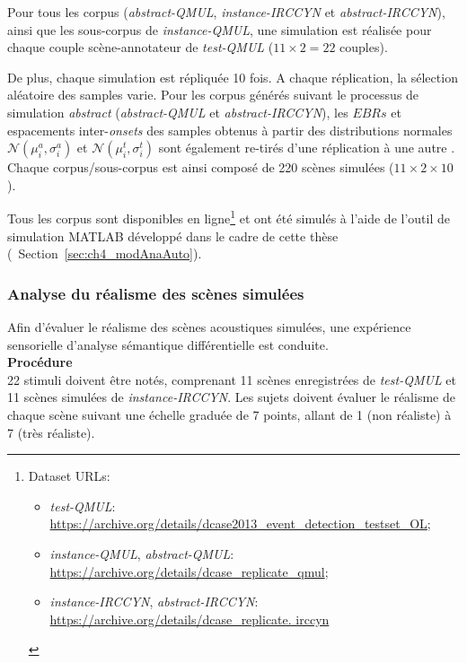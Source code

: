Pour tous les corpus (\emph{abstract-QMUL}, \emph{instance-IRCCYN} et \emph{abstract-IRCCYN}), ainsi que les sous-corpus de \emph{instance-QMUL}, une simulation est réalisée pour chaque couple scène-annotateur de \emph{test-QMUL} ($11\times2=22$ couples). 

De plus, chaque simulation est répliquée 10 fois. A chaque réplication, la sélection aléatoire des samples varie. Pour les corpus générés suivant le processus de simulation \emph{abstract} (\emph{abstract-QMUL} et \emph{abstract-IRCCYN}), les $EBRs$ et espacements inter-\emph{onsets} des samples obtenus à partir des distributions normales  $\mathcal{N}(\mu_i^a,\sigma_i^a)$ et $\mathcal{N}(\mu_i^t,\sigma_i^t)$ sont également re-tirés  d'une réplication à une autre . Chaque corpus/sous-corpus est ainsi composé de 220 scènes simulées ($11\times2\times10$).

Tous les corpus sont disponibles en ligne\footnote{Dataset URLs: \begin{itemize}
\item \emph{test-QMUL}: \url{https://archive.org/details/dcase2013_event_detection_testset_OL};
\item \emph{instance-QMUL}, \emph{abstract-QMUL}: \url{https://archive.org/details/dcase_replicate_qmul};
\item \emph{instance-IRCCYN}, \emph{abstract-IRCCYN}: \url{https://archive.org/details/dcase_replicate.
irccyn}
\end{itemize}} et ont été simulés à l'aide de l'outil de simulation MATLAB développé dans le cadre de cette thèse (\cf~Section~\ref{sec:ch4_modAnaAuto}).

\subsubsection{Analyse du réalisme des scènes simulées}

Afin d'évaluer le réalisme des scènes acoustiques simulées, une expérience sensorielle d'analyse sémantique différentielle est conduite. \\

\textbf{Procédure} \\

22 stimuli doivent être notés, comprenant 11 scènes enregistrées de \emph{test-QMUL} et 11 scènes simulées de \emph{instance-IRCCYN}. Les sujets doivent évaluer le réalisme de chaque scène suivant une échelle graduée de 7 points, allant de 1 (non réaliste) à 7 (très réaliste). 

